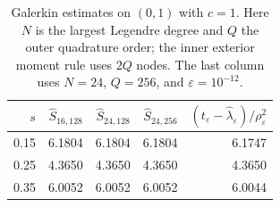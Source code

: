 \begin{table}[htbp]
\centering\small
\begin{tabular}{rrrrr}
\toprule
$s$ & $\widehat S_{16,128}$ & $\widehat S_{24,128}$ & $\widehat S_{24,256}$ & $(t_\varepsilon-\widehat\lambda_\varepsilon)/\rho_\varepsilon^2$ \\
\midrule
0.15 & 6.1804 & 6.1804 & 6.1804 & 6.1747 \\
0.25 & 4.3650 & 4.3650 & 4.3650 & 4.3650 \\
0.35 & 6.0052 & 6.0052 & 6.0052 & 6.0044 \\
\bottomrule\end{tabular}
\caption{Galerkin estimates on $(0,1)$ with $c=1$. Here $N$ is the largest Legendre degree and $Q$ the outer quadrature order; the inner exterior moment rule uses $2Q$ nodes. The last column uses $N=24$, $Q=256$, and $\varepsilon=10^{-12}$.}
\label{tab:continuum}
\end{table}
